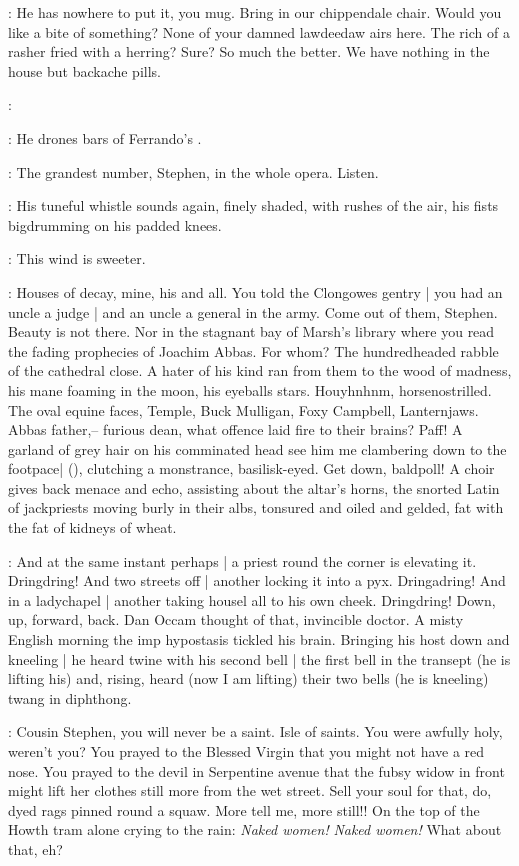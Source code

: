 \richie:
He has nowhere to put it, you mug.
Bring in our chippendale chair.
Would you like a bite of something?
None of your damned lawdeedaw airs here.
The rich of a rasher fried with a herring?
Sure?
So much the better.
We have nothing in the house but backache pills.

\richie:

:
He drones bars of Ferrando's .

\richie:
The grandest number, Stephen,
in the whole opera.
Listen.

:
His tuneful whistle sounds again, finely shaded,
with rushes of the air,
his fists bigdrumming on his padded knees.

\StephenInt:
This wind is sweeter.

\StephenInt:
Houses of decay, mine, his and all.
You told the Clongowes gentry |
you had an uncle a judge |
and an uncle a general in the army.
Come out of them, Stephen.
Beauty is not there.
Nor in the stagnant bay of Marsh's library
where you read the fading prophecies of Joachim Abbas.
For whom?
The hundredheaded rabble of the cathedral close.
A hater of his kind ran from them to the wood of madness,
his mane foaming in the moon, his eyeballs stars.
Houyhnhnm, horsenostrilled.
The oval equine faces,
Temple, Buck Mulligan, Foxy Campbell, Lanternjaws.
Abbas father,--
furious dean, what offence laid fire to their brains?
Paff!
A garland of grey hair on his comminated head
see him me clambering down to the footpace|
(),
clutching a monstrance, basilisk-eyed.
Get down, baldpoll!
A choir gives back menace and echo,
assisting about the altar's horns,
the snorted Latin of jackpriests
moving burly in their albs,
tonsured and oiled and gelded,
fat with the fat of kidneys of wheat.

\StephenInt:
And at the same instant perhaps |
a priest round the corner is elevating it.
Dringdring!
And two streets off |
another locking it into a pyx.
Dringadring!
And in a ladychapel |
another taking housel all to his own cheek.
Dringdring!
Down, up, forward, back.
Dan Occam thought of that,
invincible doctor.
A misty English morning
the imp hypostasis tickled his brain.
Bringing his host down and kneeling |
he heard twine with his second bell |
the first bell in the transept
(he is lifting his)
and, rising, heard
(now I am lifting)
their two bells
(he is kneeling)
twang in diphthong.

\StephenInt:
Cousin Stephen, you will never be a saint.
Isle of saints.
You were awfully holy, weren't you?
You prayed to the Blessed Virgin
that you might not have a red nose.
You prayed to the devil in Serpentine avenue
that the fubsy widow in front might lift her clothes
still more from the wet street.
Sell your soul for that, do, dyed rags pinned round a squaw.
More tell me, more still!!
On the top of the Howth tram alone crying to the rain:
\emph{Naked women!}
\emph{Naked women!}
What about that, eh?

